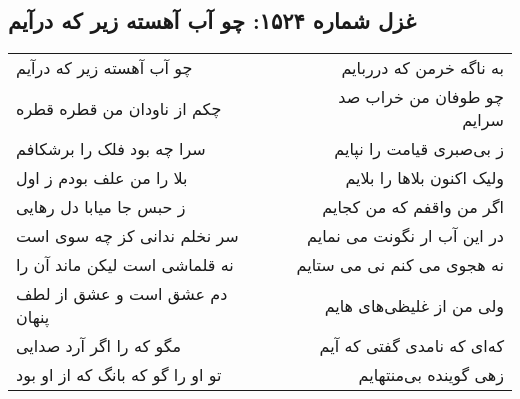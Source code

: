 \begin{center}
\section*{غزل شماره ۱۵۲۴: چو آب آهسته زیر که درآیم}
\label{sec:1524}
\begin{longtable}{l p{0.5cm} r}
چو آب آهسته زیر که درآیم
&&
به ناگه خرمن که درربایم
\\
چکم از ناودان من قطره قطره
&&
چو طوفان من خراب صد سرایم
\\
سرا چه بود فلک را برشکافم
&&
ز بی‌صبری قیامت را نپایم
\\
بلا را من علف بودم ز اول
&&
ولیک اکنون بلاها را بلایم
\\
ز حبس جا میابا دل رهایی
&&
اگر من واقفم که من کجایم
\\
سر نخلم ندانی کز چه سوی است
&&
در این آب ار نگونت می نمایم
\\
نه قلماشی است لیکن ماند آن را
&&
نه هجوی می کنم نی می ستایم
\\
دم عشق است و عشق از لطف پنهان
&&
ولی من از غلیظی‌های هایم
\\
مگو که را اگر آرد صدایی
&&
که‌ای که نامدی گفتی که آیم
\\
تو او را گو که بانگ که از او بود
&&
زهی گوینده بی‌منتهایم
\\
\end{longtable}
\end{center}
